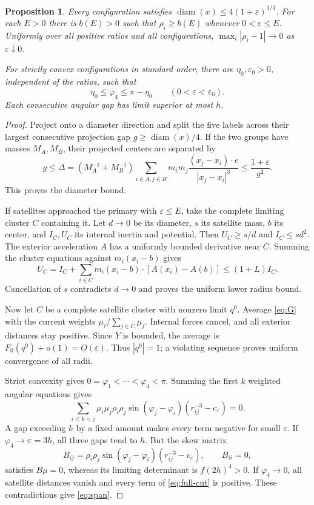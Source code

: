\documentclass[11pt,a4paper]{article}
\numberwithin{equation}{section}
\newtheorem{proposition}[theorem]{Proposition}
\theoremstyle{remark}
\newcommand{\eps}{\varepsilon}
\DeclareMathOperator{\diam}{diam}
\begin{document}
\begin{proposition}\label{prop:uniform}
Every configuration satisfies $\diam(x)\le4(1+\eps)^{1/3}$. For each $E>0$ there is $b(E)>0$ such that $\rho_i\ge b(E)$ whenever $0<\eps\le E$. Uniformly over all positive ratios and all configurations, $\max_i|\rho_i-1|\to0$ as $\eps\downarrow0$.

For strictly convex configurations in standard order, there are $\eta_0,\eps_0>0$, independent of the ratios, such that
\begin{equation}\label{eq:span}
 \eta_0\le\varphi_4\le\pi-\eta_0\qquad(0<\eps<\eps_0).
\end{equation}
Each consecutive angular gap has limit superior at most $h$.
\end{proposition}
\begin{proof}
Project onto a diameter direction and split the five labels across their largest consecutive projection gap $g\ge\diam(x)/4$. If the two groups have masses $M_A,M_B$, their projected centers are separated by
\[
 g\le\Delta=\left(M_A^{-1}+M_B^{-1}\right)
 \sum_{i\in A,j\in B}m_im_j\frac{(x_j-x_i)\cdot e}{|x_j-x_i|^3}
 \le\frac{1+\eps}{g^2}.
\]
This proves the diameter bound.

If satellites approached the primary with $\eps\le E$, take the complete limiting cluster $C$ containing it. Let $d\to0$ be its diameter, $s$ its satellite mass, $b$ its center, and $I_C,U_C$ its internal inertia and potential. Then $U_C\ge s/d$ and $I_C\le sd^2$. The exterior acceleration $A$ has a uniformly bounded derivative near $C$. Summing the cluster equations against $m_i(x_i-b)$ gives
\[
 U_C=I_C+\sum_{i\in C}m_i(x_i-b)\cdot[A(x_i)-A(b)]\le(1+L)I_C.
\]
Cancellation of $s$ contradicts $d\to0$ and proves the uniform lower radius bound.

Now let $C$ be a complete satellite cluster with nonzero limit $q^0$. Average \eqref{eq:G} with the current weights $\mu_i/\sum_{j\in C}\mu_j$. Internal forces cancel, and all exterior distances stay positive. Since $Y$ is bounded, the average is $F_0(q^0)+o(1)=O(\eps)$. Thus $|q^0|=1$; a violating sequence proves uniform convergence of all radii.

Strict convexity gives $0=\varphi_1<\cdots<\varphi_4<\pi$. Summing the first $k$ weighted angular equations gives
\begin{equation}\label{eq:full-cut}
 \sum_{i\le k<j}\mu_i\mu_j\rho_i\rho_j\sin(\varphi_j-\varphi_i)(r_{ij}^{-3}-c_\eps)=0.
\end{equation}
A gap exceeding $h$ by a fixed amount makes every term negative for small $\eps$. If $\varphi_4\to\pi=3h$, all three gaps tend to $h$. But the skew matrix
\[
 B_{ij}=\rho_i\rho_j\sin(\varphi_j-\varphi_i)(r_{ij}^{-3}-c_\eps),\qquad B_{ii}=0,
\]
satisfies $B\mu=0$, whereas its limiting determinant is $f(2h)^4>0$. If $\varphi_4\to0$, all satellite distances vanish and every term of \eqref{eq:full-cut} is positive. These contradictions give \eqref{eq:span}.
\end{proof}
\end{document}
